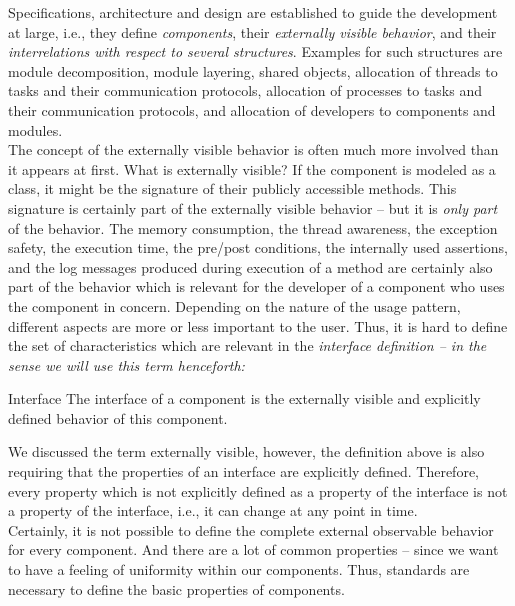 Specifications, architecture and design are established to guide the
development at large, i.e., they define \emph{components}, their
\emph{externally visible behavior}, and their \emph{interrelations
  with respect to several structures}. Examples for such structures
are module decomposition, module layering, shared objects, allocation
of threads to tasks and their communication protocols, allocation of
processes to tasks and their communication protocols, and allocation
of developers to components and modules.\\
%
The concept of the externally visible behavior is often much more
involved than it appears at first. What is externally visible? If the
component is modeled as a class, it might be the signature of their
publicly accessible methods. This signature is certainly part of the
externally visible behavior -- but it is \emph{only part} of the
behavior. The memory consumption, the thread awareness, the exception
safety, the execution time, the pre/post conditions, the internally
used assertions, and the log messages produced during execution of a
method are certainly also part of the behavior which is relevant for
the developer of a component who uses the component in concern.
Depending on the nature of the usage pattern, different aspects are
more or less important to the user. Thus, it is hard to define the set
of characteristics which are relevant in the \emph{interface
  definition -- in the sense we will use this term henceforth:}
\begin{definition*}{Interface}
  The interface of a component is the externally visible and
  explicitly defined behavior of this component.
\end{definition*}
%
We discussed the term externally visible, however, the definition
above is also requiring that the properties of an interface are
explicitly defined. Therefore, every property which is not explicitly
defined as a property of the interface is not a property of the
interface, i.e., it can change at any point in time.\\
%
Certainly, it is not possible to define the complete external
observable behavior for every component. And there are a lot of common
properties -- since we want to have a feeling of uniformity within our
components. 
%
Thus, standards are necessary to define the basic properties of
components.

